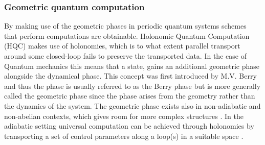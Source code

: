 \subsubsection{Geometric quantum computation}
By making use of the geometric phases in periodic quantum systems schemes that perform computations are obtainable. Holonomic Quantum Computation (HQC) makes use of holonomies, which is to what extent parallel transport around some closed-loop fails to preserve the transported data. In the case of Quantum mechanics this means that a state, gains an additional geometric phase alongside the dynamical phase. This concept was first introduced by M.V. Berry \cite{berry} and thus the phase is usually referred to as the Berry phase but is more generally called the geometric phase since the phase arises from the geometry rather than the dynamics of the system. The geometric phase exists also in non-adiabatic and non-abelian contexts, which gives room for more complex structures \cite{anandan1, anandan2, zee}. 
In the adiabatic setting universal computation can be achieved through holonomies by transporting a set of control parameters along a loop(s) in a suitable space \cite{HQC}. 

